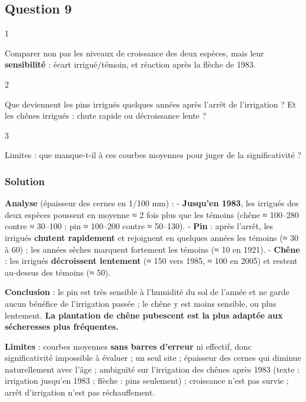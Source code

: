 \documentclass[11pt,a4paper]{article}
\begin{document}
\hypertarget{question-9}{%
\subsection{Question 9}\label{question-9}}

\begin{indication}{1}

Comparer non pas les niveaux de croissance des deux espèces, mais leur \textbf{sensibilité} : écart irrigué/témoin, et réaction après la flèche de 1983.

\end{indication}

\begin{indication}{2}

Que deviennent les pins irrigués quelques années après l'arrêt de l'irrigation ? Et les chênes irrigués : chute rapide ou décroissance lente ?

\end{indication}

\begin{indication}{3}

Limites : que manque-t-il à ces courbes moyennes pour juger de la significativité ?

\end{indication}

\hypertarget{solution-8}{%
\subsubsection{Solution}\label{solution-8}}

\textbf{Analyse} (épaisseur des cernes en 1/100 mm) :
- \textbf{Jusqu'en 1983}, les irrigués des deux espèces poussent en moyenne ≈ 2 fois plus que les témoins (chêne ≈ 100--280 contre ≈ 30--100 ; pin ≈ 100--200 contre ≈ 50--130).
- \textbf{Pin} : après l'arrêt, les irrigués \textbf{chutent rapidement} et rejoignent en quelques années les témoins (≈ 30 à 60) ; les années sèches marquent fortement les témoins (≈ 10 en 1921).
- \textbf{Chêne} : les irrigués \textbf{décroissent lentement} (≈ 150 vers 1985, ≈ 100 en 2005) et restent au-dessus des témoins (≈ 50).

\textbf{Conclusion} : le pin est très sensible à l'humidité du sol de l'année et ne garde aucun bénéfice de l'irrigation passée ; le chêne y est moins sensible, ou plus lentement. \textbf{La plantation de chêne pubescent est la plus adaptée aux sécheresses plus fréquentes.}

\textbf{Limites} : courbes moyennes \textbf{sans barres d'erreur} ni effectif, donc significativité impossible à évaluer ; un seul site ; épaisseur des cernes qui diminue naturellement avec l'âge ; ambiguïté sur l'irrigation des chênes après 1983 (texte : irrigation jusqu'en 1983 ; flèche : pins seulement) ; croissance n'est pas survie ; arrêt d'irrigation n'est pas réchauffement.
\end{document}
